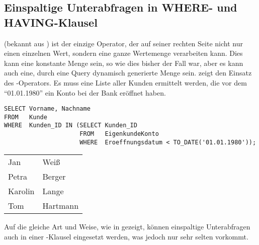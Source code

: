 \subsection{Einspaltige Unterabfragen in WHERE- und HAVING-Klausel}
 (bekannt aus ) ist der einzige Operator, der auf seiner rechten Seite nicht nur einen einzelnen Wert, sondern eine ganze Wertemenge verarbeiten kann. Dies kann eine konstante Menge sein, so wie dies bisher der Fall war, aber es kann auch eine, durch eine Query dynamisch generierte Menge sein.  zeigt den Einsatz des -Operators. Es muss eine Liste aller Kunden ermittelt werden, die vor dem \enquote{01.01.1980} ein Konto bei der Bank eröffnet haben.
\begin{lstlisting}[language=oracle_sql,caption={\languageorasql{IN} mit Unterabfrage},label=sql06_07]
SELECT Vorname, Nachname
FROM   Kunde
WHERE  Kunden_ID IN (SELECT Kunden_ID
                     FROM   EigenkundeKonto
                     WHERE  Eroeffnungsdatum < TO_DATE('01.01.1980'));
        \end{lstlisting}
\begin{center}
    \begin{small}
        \tablehead{}
        \begin{msoraclesql}
            \begin{supertabular}{ll}
                Jan & Weiß \\
                Petra & Berger \\
                Karolin & Lange \\
                Tom & Hartmann \\
            \end{supertabular}
        \end{msoraclesql}
    \end{small}
\end{center}
Auf die gleiche Art und Weise, wie in  gezeigt, können einspaltige Unterabfragen auch in einer \HAVING-Klausel eingesetzt werden, was jedoch nur sehr selten vorkommt.
